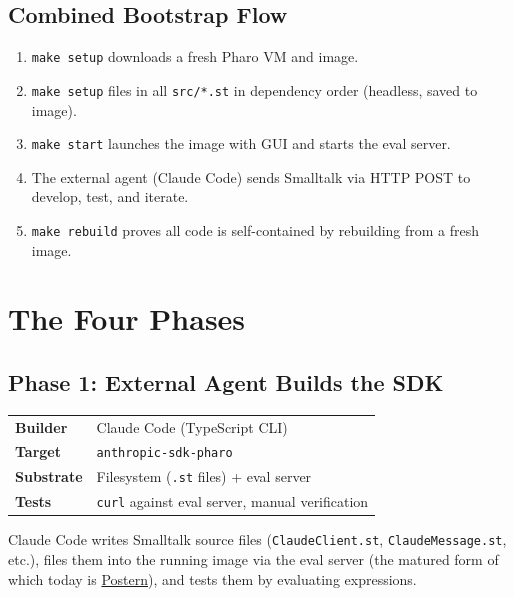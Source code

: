 \documentclass[a4paper,10pt,fleqn]{article}
\begin{document}
\subsection{Combined Bootstrap Flow}

\begin{enumerate}
  \item \texttt{make setup} downloads a fresh Pharo VM and image.
  \item \texttt{make setup} files in all \texttt{src/*.st} in
    dependency order (headless, saved to image).
  \item \texttt{make start} launches the image with GUI and starts the
    eval server.
  \item The external agent (Claude Code) sends Smalltalk via HTTP POST
    to develop, test, and iterate.
  \item \texttt{make rebuild} proves all code is self-contained by
    rebuilding from a fresh image.
\end{enumerate}

\section{The Four Phases}

\subsection{Phase 1: External Agent Builds the SDK}

\begin{center}
\begin{tabularx}{\linewidth}{@{}lY@{}}
\toprule
\textbf{Builder} & Claude Code (TypeScript CLI) \\
\textbf{Target} & \texttt{anthropic-sdk-pharo} \\
\textbf{Substrate} & Filesystem (\texttt{.st} files) + eval server \\
\textbf{Tests} & \texttt{curl} against eval server, manual verification \\
\bottomrule
\end{tabularx}
\end{center}

Claude Code writes Smalltalk source files (\texttt{ClaudeClient.st},
\texttt{ClaudeMessage.st}, etc.), files them into the running image via
the eval server (the matured form of which today is
\href{https://github.com/punt-labs/postern}{Postern}), and tests them
by evaluating expressions.
\end{document}
